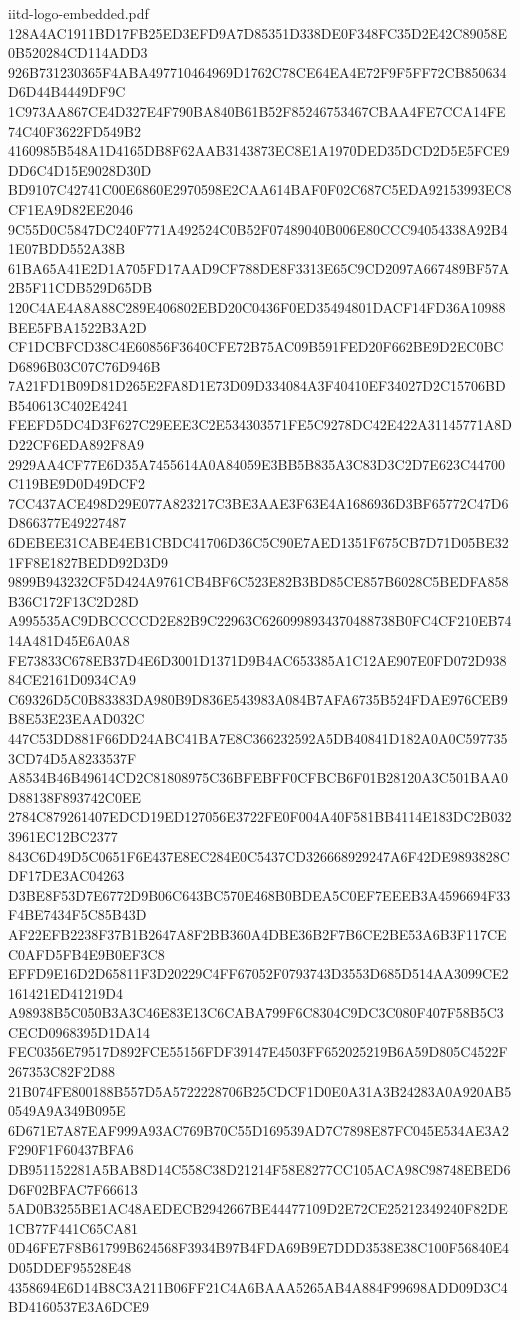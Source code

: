 \begin{filecontents*}[overwrite]{iitd-logo-embedded.pdf}
128A4AC1911BD17FB25ED3EFD9A7D85351D338DE0F348FC35D2E42C89058E0B520284CD114ADD3
926B731230365F4ABA497710464969D1762C78CE64EA4E72F9F5FF72CB850634D6D44B4449DF9C
1C973AA867CE4D327E4F790BA840B61B52F85246753467CBAA4FE7CCA14FE74C40F3622FD549B2
4160985B548A1D4165DB8F62AAB3143873EC8E1A1970DED35DCD2D5E5FCE9DD6C4D15E9028D30D
BD9107C42741C00E6860E2970598E2CAA614BAF0F02C687C5EDA92153993EC8CF1EA9D82EE2046
9C55D0C5847DC240F771A492524C0B52F07489040B006E80CCC94054338A92B41E07BDD552A38B
61BA65A41E2D1A705FD17AAD9CF788DE8F3313E65C9CD2097A667489BF57A2B5F11CDB529D65DB
120C4AE4A8A88C289E406802EBD20C0436F0ED35494801DACF14FD36A10988BEE5FBA1522B3A2D
CF1DCBFCD38C4E60856F3640CFE72B75AC09B591FED20F662BE9D2EC0BCD6896B03C07C76D946B
7A21FD1B09D81D265E2FA8D1E73D09D334084A3F40410EF34027D2C15706BDB540613C402E4241
FEEFD5DC4D3F627C29EEE3C2E534303571FE5C9278DC42E422A31145771A8DD22CF6EDA892F8A9
2929AA4CF77E6D35A7455614A0A84059E3BB5B835A3C83D3C2D7E623C44700C119BE9D0D49DCF2
7CC437ACE498D29E077A823217C3BE3AAE3F63E4A1686936D3BF65772C47D6D866377E49227487
6DEBEE31CABE4EB1CBDC41706D36C5C90E7AED1351F675CB7D71D05BE321FF8E1827BEDD92D3D9
9899B943232CF5D424A9761CB4BF6C523E82B3BD85CE857B6028C5BEDFA858B36C172F13C2D28D
A995535AC9DBCCCCD2E82B9C22963C6260998934370488738B0FC4CF210EB7414A481D45E6A0A8
FE73833C678EB37D4E6D3001D1371D9B4AC653385A1C12AE907E0FD072D93884CE2161D0934CA9
C69326D5C0B83383DA980B9D836E543983A084B7AFA6735B524FDAE976CEB9B8E53E23EAAD032C
447C53DD881F66DD24ABC41BA7E8C366232592A5DB40841D182A0A0C5977353CD74D5A8233537F
A8534B46B49614CD2C81808975C36BFEBFF0CFBCB6F01B28120A3C501BAA0D88138F893742C0EE
2784C879261407EDCD19ED127056E3722FE0F004A40F581BB4114E183DC2B0323961EC12BC2377
843C6D49D5C0651F6E437E8EC284E0C5437CD326668929247A6F42DE9893828CDF17DE3AC04263
D3BE8F53D7E6772D9B06C643BC570E468B0BDEA5C0EF7EEEB3A4596694F33F4BE7434F5C85B43D
AF22EFB2238F37B1B2647A8F2BB360A4DBE36B2F7B6CE2BE53A6B3F117CEC0AFD5FB4E9B0EF3C8
EFFD9E16D2D65811F3D20229C4FF67052F0793743D3553D685D514AA3099CE2161421ED41219D4
A98938B5C050B3A3C46E83E13C6CABA799F6C8304C9DC3C080F407F58B5C3CECD0968395D1DA14
FEC0356E79517D892FCE55156FDF39147E4503FF652025219B6A59D805C4522F267353C82F2D88
21B074FE800188B557D5A5722228706B25CDCF1D0E0A31A3B24283A0A920AB50549A9A349B095E
6D671E7A87EAF999A93AC769B70C55D169539AD7C7898E87FC045E534AE3A2F290F1F60437BFA6
DB951152281A5BAB8D14C558C38D21214F58E8277CC105ACA98C98748EBED6D6F02BFAC7F66613
5AD0B3255BE1AC48AEDECB2942667BE44477109D2E72CE25212349240F82DE1CB77F441C65CA81
0D46FE7F8B61799B624568F3934B97B4FDA69B9E7DDD3538E38C100F56840E4D05DDEF95528E48
4358694E6D14B8C3A211B06FF21C4A6BAAA5265AB4A884F99698ADD09D3C4BD4160537E3A6DCE9

\end{filecontents*}
